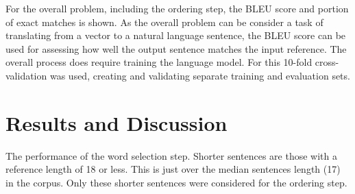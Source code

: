 \documentclass[11pt]{article}
\numberwithin{equation}{section}
\numberwithin{figure}{section}
\theoremstyle{plain}
\theoremstyle{definition}
\begin{document}
For the overall problem, including the ordering step, the BLEU score and portion of exact matches is shown. As the overall problem can be consider a task of translating from a vector to a natural language sentence, the BLEU  score \parencite{Papineni2002} can be used for assessing how well the output sentence matches the input reference. The overall process does require training the language model. For this 10-fold cross-validation was used, creating and validating separate training and evaluation sets.

\section{Results and Discussion} \label{results}

\begin{table}
	\caption{ The performance of the word selection step. Shorter sentences are those with a reference length of 18 or less. This is just over the median sentences length (17) in the corpus. Only these shorter sentences were considered for the ordering step.}
	\label{table:overall}
\end{table}
\end{document}
